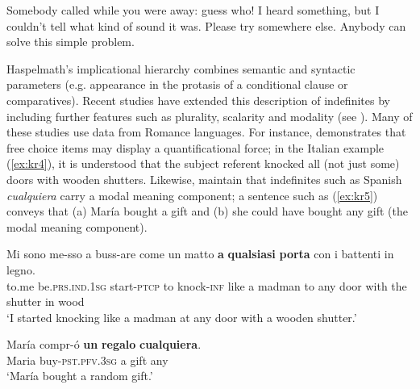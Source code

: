 \documentclass[output=paper,colorlinks,citecolor=brown]{langscibook}
\begin{document}
\ea\label{ex:kr3}
    \ea\label{ex:kr3a} Somebody called while you were away: guess who!
    \ex\label{ex:kr3b} I heard something, but I couldn't tell what kind of sound it was.
    \ex\label{ex:kr3c} Please try somewhere else.
    \ex\label{ex:kr3d} Anybody can solve this simple problem.
    \z
\z

Haspelmath's implicational hierarchy combines semantic and syntactic parameters (e.g. appearance in the protasis of a conditional clause or comparatives). Recent studies have extended this description of indefinites by including further features such as plurality, scalarity and modality (see \citealt{Chierchia2006, Alonso-OvalleMenéndez-Benito2015, Falaus2015, Falaus2018, Kellert2021a}). Many of these studies use data from Romance languages. For instance, \citet{Chierchia2006} demonstrates that free choice items may display a quantificational force; in the Italian example (\ref{ex:kr4}), it is understood that the subject referent knocked all (not just some) doors with wooden shutters. Likewise, \citet{Alonso-OvalleMenéndez-Benito2015} maintain that indefinites such as Spanish \textit{cualquiera} carry a modal meaning component; a sentence such as (\ref{ex:kr5}) conveys that (a) María bought a gift and (b) she could have bought any gift (the modal meaning component). 

\ea\label{ex:kr4} 
\gll Mi sono me-sso a buss-are come un matto \textbf{a} \textbf{qualsiasi} \textbf{porta} con i battenti in legno.\\
     to.me	be.\textsc{prs.ind.1sg} start-\textsc{ptcp} to knock-\textsc{inf} like a madman to any door with the shutter in wood\\
\glt ‘I started knocking like a madman at any door with a wooden shutter.’
\z

\ea\label{ex:kr5} 
\gll María compr-ó \textbf{un} \textbf{regalo} \textbf{cualquiera}.\\
     Maria buy-\textsc{pst.pfv.3sg} a gift any\\
\glt ‘María bought a random gift.’
\z
\end{document}
